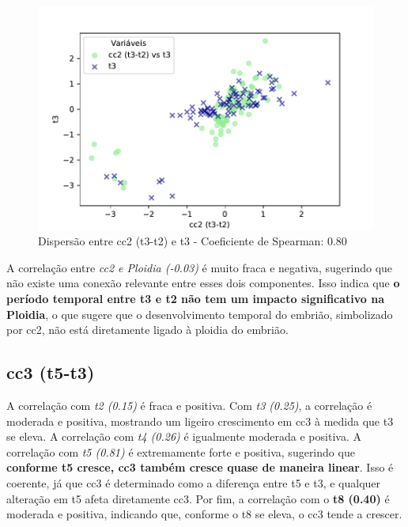 \begin{figure}[h]
    \captionsetup{font=footnotesize, justification=centering, labelsep=period, position=above}
    \label{fig:cc2-t3}
    \centering
    \includegraphics[scale=0.5]{figuras/Spearman/cc2-t3.pdf}
    \caption{Dispersão entre cc2 (t3-t2) e t3 - Coeficiente de Spearman: 0.80}
    \vspace{0.3cm} 
    \begin{minipage}{\linewidth}
        \centering
    \end{minipage}
\end{figure}
\FloatBarrier

A correlação entre \textit{cc2 e Ploidia (-0.03)} é muito fraca e negativa, sugerindo que não existe uma conexão relevante entre esses dois componentes. Isso indica que \textbf{o período temporal entre t3 e t2 não tem um impacto significativo na Ploidia}, o que sugere que o desenvolvimento temporal do embrião, simbolizado por cc2, não está diretamente ligado à ploidia do embrião.

\subsection*{cc3 (t5-t3)}
A correlação com \textit{t2 (0.15)} é fraca e positiva. Com \textit{t3 (0.25)}, a correlação é moderada e positiva, mostrando um ligeiro crescimento em cc3 à medida que t3 se eleva. A correlação com \textit{t4 (0.26)} é igualmente moderada e positiva. A correlação com \textit{t5 (0.81)} é extremamente forte e positiva, sugerindo que \textbf{conforme t5 cresce, cc3 também cresce quase de maneira linear}. Isso é coerente, já que cc3 é determinado como a diferença entre t5 e t3, e qualquer alteração em t5 afeta diretamente cc3. Por fim, a correlação com o \textbf{t8 (0.40)} é moderada e positiva, indicando que, conforme o t8 se eleva, o cc3 tende a crescer.

